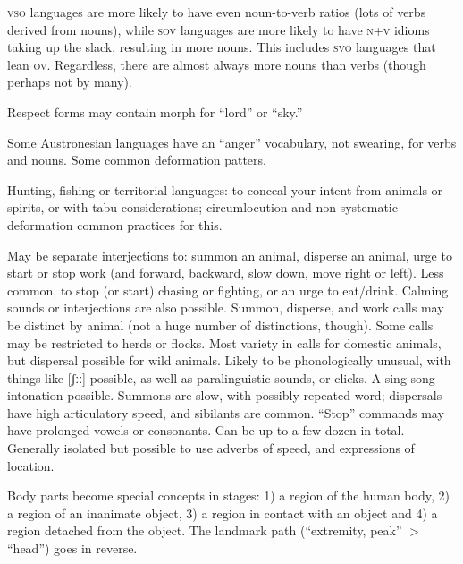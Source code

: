 \documentclass[11pt]{article}
\newcommand{\I}[1]{\textsc{#1}}   %
\begin{document}
{%
\I{vso} languages are more likely to have even noun-to-verb ratios
(lots of verbs derived from nouns), while \I{sov} languages are more
likely to have \I{n+v} idioms taking up the slack, resulting in more
nouns.  This includes \I{svo} languages that lean \I{ov}.  Regardless,
there are almost always more nouns than verbs (though perhaps not by
many).

Respect forms may contain morph for ``lord'' or ``sky.''

Some Austronesian languages have an ``anger'' vocabulary, not
swearing, for verbs and nouns.  Some common deformation patters.

Hunting, fishing or territorial languages: to conceal your intent from
animals or spirits, or with tabu considerations; circumlocution and
non-systematic deformation common practices for this.

May be separate interjections to: summon an animal, disperse an
animal, urge to start or stop work (and forward, backward, slow down,
move right or left).  Less common, to stop (or start) chasing or
fighting, or an urge to eat/drink.  Calming sounds or interjections
are also possible.  Summon, disperse, and work calls may be distinct
by animal (not a huge number of distinctions, though).  Some calls may
be restricted to herds or flocks.  Most variety in calls for domestic
animals, but dispersal possible for wild animals.  Likely to be
phonologically unusual, with things like [ʃːː] possible, as well as
paralinguistic sounds, or clicks.  A sing-song intonation possible.
Summons are slow, with possibly repeated word; dispersals have high
articulatory speed, and sibilants are common.  ``Stop'' commands may
have prolonged vowels or consonants.  Can be up to a few dozen in
total.  Generally isolated but possible to use adverbs of speed, and
expressions of location.

Body parts become special concepts in stages: 1) a region of the human
body, 2) a region of an inanimate object, 3) a region in contact with
an object and 4) a region detached from the object.  The landmark path
(``extremity, peak'' $>$ ``head'') goes in reverse.

}
\end{document}
